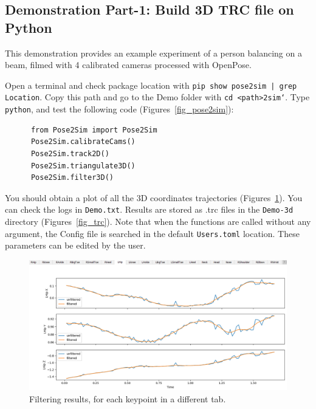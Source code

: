\subsection{Demonstration Part-1: Build 3D TRC file on Python}

This demonstration provides an example experiment of a person balancing on a beam, filmed with 4 calibrated cameras processed with OpenPose.

Open a terminal and check package location with  \texttt{pip show pose2sim | grep Location}. \newline
Copy this path and go to the Demo folder with  \texttt{cd <path>\pose2sim\Demo`}. \newline
Type \texttt{python}, and test the following code (Figures~\ref{fig_pose2sim}):
\begin{verbatim}
      from Pose2Sim import Pose2Sim
      Pose2Sim.calibrateCams()
      Pose2Sim.track2D()
      Pose2Sim.triangulate3D()
      Pose2Sim.filter3D()
\end{verbatim}

You should obtain a plot of all the 3D coordinates trajectories (Figures~\ref{fig_filterplot}). You can check the logs in \texttt{Demo\Users\logs.txt}. Results are stored as .trc files in the \texttt{Demo\pose-3d} directory (Figures~\ref{fig_trc}). Note that when the functions are called without any argument, the Config file is searched in the default \texttt{Users\Config.toml} location. These parameters can be edited by the user.

\begin{figure}[hbtp]
	\centering
	\def\svgwidth{1\columnwidth}
	\fontsize{10pt}{10pt}\selectfont
	\includegraphics[width=\linewidth]{"../Chap3/Figures/FilterPlot.png"}
	\caption{Filtering results, for each keypoint in a different tab.}
	\label{fig_filterplot}
\end{figure}

